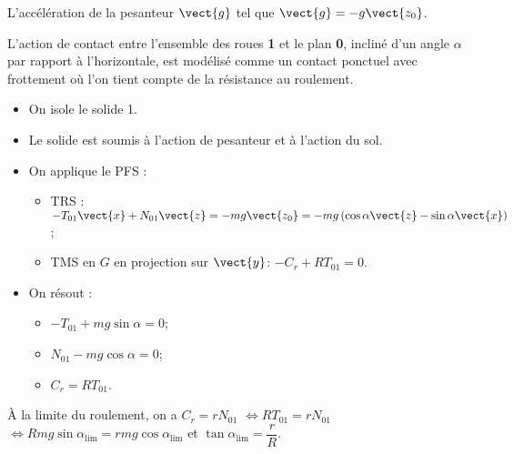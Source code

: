 L'accélération de la pesanteur $\vect{g}$ tel que $\vect{g}=-g\vect{z_0}$. 



L’action de contact entre l’ensemble des roues  \textbf{1} et le plan \textbf{0}, incliné d’un angle $\alpha$ par rapport à l’horizontale, est  modélisé comme un contact ponctuel avec frottement où l’on tient compte de la résistance au roulement. 



\fi

\ifprof
\begin{corrige}
\begin{itemize}
\item On isole le solide 1. 
\item Le solide est soumis à l'action de pesanteur et à l'action du sol. 
\item On applique le PFS :
\begin{itemize}
\item TRS : $-T_{01}\vect{x}+N_{01}\vect{z}=-mg\vect{z_0}=-mg\left( \cos \alpha \vect{z}-\sin\alpha \vect{x} \right)$;
\item TMS en $G$ en projection sur $\vect{y}$: $-C_r+RT_{01}=0$.
\end{itemize}
\item On résout : 
\begin{itemize}
\item $-T_{01} +mg\sin\alpha = 0$;
\item $N_{01} -mg\cos\alpha = 0$;
\item $C_r=RT_{01}$.
\end{itemize}
\end{itemize}
\end{corrige}
\else
\fi


\ifprof
\begin{corrige}
À la limite du roulement, on a $C_r=rN_{01}$ $\Leftrightarrow RT_{01}=rN_{01}$ $\Leftrightarrow Rmg\sin\alpha_{\text{lim}}=rmg\cos\alpha_{\text{lim}}$ et  $\tan \alpha_{\text{lim}} = \dfrac{r}{R}$.
\end{corrige}
\else
\fi

